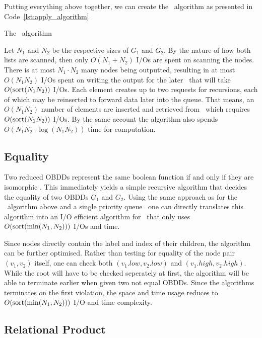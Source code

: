 \begin{lstfloat}[ht!]
  \centering

  

  \caption{Construction of to-be-outputted node \lstinline{v'} and recursing
    using \ApplyQrec.}
  \label{lst:apply_recurse_node}
\end{lstfloat}

Putting everything above together, we can create the \Apply\ algorithm as
presented in Code~\ref{lst:apply_algorithm}

\begin{lstfloat}[ht!]
  \centering

  

  \caption{The \Apply\ algorithm}
  \label{lst:apply_algorithm}
\end{lstfloat}

\clearpage
Let $N_1$ and $N_2$ be the respective sizes of $G_1$ and $G_2$. By the nature of
how both lists are scanned, then only $O(N_1 + N_2)$ I/Os are spent on scanning
the nodes. There is at most $N_1 \cdot N_2$ many nodes being outputted,
resulting in at most $O(N_1 N_2)$ I/Os spent on writing the output for the later
\Reduce\ that will take $O(\text{sort}(N_1 N_2))$ I/Os. Each element creates up to two
requests for recursions, each of which may be reinserted to forward data later
into the queue. That means, an $O(N_1 N_2)$ number of elements are inserted and
retrieved from \ApplyQrec\ which requires $O(\text{sort}(N_1 N_2))$ I/Os. By the same
account the algorithm also spends $O(N_1 N_2 \cdot \log (N_1 N_2))$ time for
computation. \cite{Arge96}

\subsection{Equality} \label{sec:theory__equal}
Two reduced OBDDs represent the same boolean function if and only if they are
isomorphic \cite[Theorem 1]{Bryant86}. This immediately yields a simple
recursive algorithm that decides the equality of two OBDDs $G_1$ and $G_2$.
Using the same approach as for the \Apply\ algorithm above and a single priority
queue \EqualQrec\, one can directly translates this algorithm into an I/O
efficient algorithm for \Equal\ that only uses $O(\text{sort}(\min(N_1, N_2)))$ I/Os and
time.

Since nodes directly contain the label and index of their children, the
algorithm can be further optimised. Rather than testing for equality of the node
pair $(v_1,v_2)$ itself, one can check both $(v_1.\mathit{low},
v_2.\mathit{low})$ and $(v_1.\mathit{high}, v_2.\mathit{high})$. While the root
will have to be checked seperately at first, the algorithm will be able to
terminate earlier when given two not equal OBDDs. Since the algorithms
terminates on the first violation, the space and time usage reduces to
$O(\text{sort}(\min(N_1, N_2)))$ I/O and time complexity.

\subsection{Relational Product} \label{sec:theory__relational_product}


